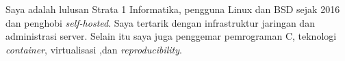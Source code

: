 

\begin{cvparagraph}

  Saya adalah lulusan Strata 1 Informatika, pengguna Linux
  dan BSD sejak 2016 dan penghobi \textit{self-hosted}. Saya
  tertarik dengan infrastruktur jaringan dan administrasi
  server. Selain itu saya juga penggemar pemrograman C,
  teknologi \textit{container}, virtualisasi ,dan
  \textit{reproducibility}.
\end{cvparagraph}
